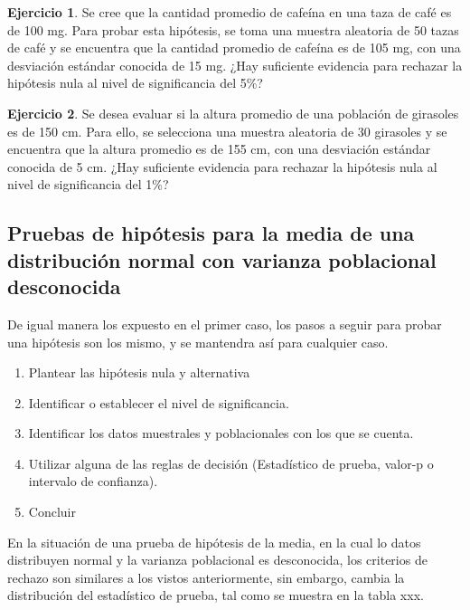 \documentclass[
]{book}
\providecommand{\tightlist}{%
  \setlength{\itemsep}{0pt}\setlength{\parskip}{0pt}}
\theoremstyle{definition}
\theoremstyle{definition}
\theoremstyle{definition}
\newtheorem{exercise}{Ejercicio}[chapter]
\theoremstyle{definition}
\theoremstyle{remark}
\begin{document}
\begin{exercise}
Se cree que la cantidad promedio de cafeína en una taza de café es de 100 mg. Para probar esta hipótesis, se toma una muestra aleatoria de 50 tazas de café y se encuentra que la cantidad promedio de cafeína es de 105 mg, con una desviación estándar conocida de 15 mg. ¿Hay suficiente evidencia para rechazar la hipótesis nula al nivel de significancia del 5\%?
\end{exercise}

\begin{exercise}
Se desea evaluar si la altura promedio de una población de girasoles es de 150 cm. Para ello, se selecciona una muestra aleatoria de 30 girasoles y se encuentra que la altura promedio es de 155 cm, con una desviación estándar conocida de 5 cm. ¿Hay suficiente evidencia para rechazar la hipótesis nula al nivel de significancia del 1\%?
\end{exercise}

\hypertarget{pruebas-de-hipuxf3tesis-para-la-media-de-una-distribuciuxf3n-normal-con-varianza-poblacional-desconocida}{%
\subsection*{Pruebas de hipótesis para la media de una distribución normal con varianza poblacional desconocida}\label{pruebas-de-hipuxf3tesis-para-la-media-de-una-distribuciuxf3n-normal-con-varianza-poblacional-desconocida}}

De igual manera los expuesto en el primer caso, los pasos a seguir para probar una hipótesis son los mismo, y se mantendra así para cualquier caso.

\begin{enumerate}
\def\labelenumi{\arabic{enumi}.}
\tightlist
\item
  Plantear las hipótesis nula y alternativa
\item
  Identificar o establecer el nivel de significancia.
\item
  Identificar los datos muestrales y poblacionales con los que se cuenta.
\item
  Utilizar alguna de las reglas de decisión (Estadístico de prueba, valor-p o intervalo de confianza).
\item
  Concluir
\end{enumerate}

En la situación de una prueba de hipótesis de la media, en la cual lo datos distribuyen normal y la varianza poblacional es desconocida, los criterios de rechazo son similares a los vistos anteriormente, sin embargo, cambia la distribución del estadístico de prueba, tal como se muestra en la tabla xxx.
\end{document}
